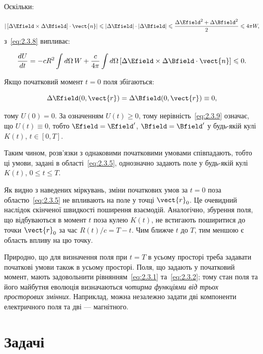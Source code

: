Оскільки:

\begin{equation*}
| \left[ \Delta \Efield \times \Delta \Bfield \right]  \cdot \vect{n} | \leqslant | \Delta \Efield | \cdot | \Delta \Bfield | \leqslant \frac{\Delta \Efield^2 +
\Delta \Bfield^2}{2} \leqslant 4\pi W,
\end{equation*}
з~\eqref{eq:2.3.8} випливає:

\begin{equation}\label{eq:2.3.9}
\frac{dU}{dt} = -c R^2 \int d\Omega \, W + \frac{c}{4\pi} \int d\Omega \, [\Delta \Efield \times \Delta \Bfield \cdot \vect{n}] \leqslant 0.
\end{equation}

Якщо початковий момент \( t = 0 \) поля збігаються:

\begin{equation*}
\Delta \Efield(0, \vect{r}) = \Delta \Bfield(0, \vect{r}) \equiv 0,
\end{equation*}

тому \( U(0) = 0 \). За означенням \( U(t) \geqslant0 \), тому нерівність~\eqref{eq:2.3.9} означає, що \( U(t) \equiv 0 \), тобто \( \Efield = \Efield'
\), \( \Bfield = \Bfield' \) у будь-якій кулі \( K(t) \), \( t \in [0, T] \).

Таким чином, розв’язки з однаковими початковими умовами співпадають, тобто ці умови, задані в області~\eqref{eq:2.3.5}, однозначно задають поле у
будь-якій кулі \( K(t) \), \( 0 \leqslant t \leqslant T \).

Як видно з наведених міркувань, зміни початкових умов за \( t = 0 \) поза областю~\eqref{eq:2.3.5} не впливають на поле у точці \( \vect{r}_0 \). Це
очевидний наслідок скінченої швидкості поширення взаємодій. Аналогічно, збурення поля, що відбуваються в момент \( t \) поза кулею \( K(t) \), не
встигають поширитися до точки \( \vect{r}_0 \) за час \( R(t)/c = T - t \). Чим ближче \( t \) до \( T \), тим меншою є область впливу на цю точку.

Природно, що для визначення поля при \( t = T \) в усьому просторі треба задавати початкові умови також в усьому просторі. Поля, що задають у початковий
момент, мають задовольнити рівнянням~\eqref{eq:2.3.1} та~\eqref{eq:2.3.2}; тому стан поля та його майбутня еволюція визначаються \emph{чотирма функціями
від трьох просторових змінних}. Наприклад, можна незалежно задати дві компоненти електричного поля та дві --- магнітного.

\section*{Задачі}

